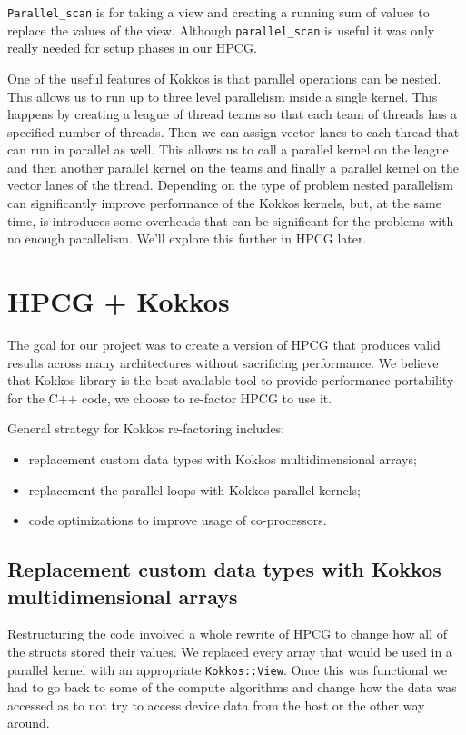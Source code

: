 \documentclass{ccr15}
\begin{document}
\texttt{Parallel\_scan} is for taking a view and creating a running sum of values
to replace the values of the view. Although \texttt{parallel\_scan} is useful it was only really needed
for setup phases in our HPCG.

One of the useful features of Kokkos is that parallel operations can be nested. This allows us to run up to three level parallelism inside a single kernel. This
happens by creating a league of thread teams so that each team of threads has a specified number of threads.
Then we can assign vector lanes to each thread that can run in parallel as well. This allows us to call a parallel kernel on the 
league and then another parallel kernel on the teams and finally a parallel kernel on the vector lanes of the thread.
Depending on the type of problem nested parallelism can significantly improve performance of the Kokkos kernels, but, at the same time, is introduces some overheads that can 
be significant for the problems with no enough parallelism. We'll explore this further in HPCG later.

\section{HPCG + Kokkos}

The goal for our project was to create a version of HPCG that 
produces valid results across many architectures without sacrificing performance.
We believe that Kokkos library is the best available tool to provide performance portability for the C++ code, we choose to re-factor HPCG to use it.

General strategy for Kokkos re-factoring includes: 
\begin{itemize}
\item replacement custom data types with Kokkos multidimensional arrays; 
\item replacement the parallel loops with Kokkos parallel kernels; 
\item code optimizations to improve usage of co-processors.
\end{itemize}


\subsection{Replacement custom data types with Kokkos multidimensional arrays}

Restructuring the code involved a whole rewrite of HPCG to change how all of the structs stored
their values. We replaced every array that would be used in a parallel kernel with an appropriate
\texttt{Kokkos::View}. Once this was functional we had to go back to some of the compute algorithms and change
how the data was accessed as to not try to access device data from the host or the
other way around.
\end{document}
